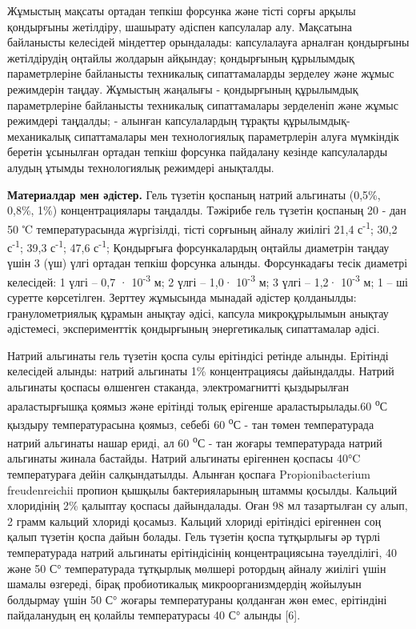\begin{multicols}{2}
Жұмыстың мақсаты ортадан тепкіш форсунка және тісті сорғы арқылы
қондырғыны жетілдіру, шашырату әдіспен капсулалар алу. Мақсатына
байланысты келесідей міндеттер орындалады: капсулалауға арналған
қондырғыны жетілдірудің оңтайлы жолдарын айқындау; қондырғының
құрылымдық параметрлеріне байланысты техникалық сипаттамаларды зерделеу
және жұмыс режимдерін таңдау. Жұмыстың жаңалығы - қондырғының құрылымдық
параметрлеріне байланысты техникалық сипаттамалары зерделеніп және жұмыс
режимдері таңдалды; - алынған капсулалардың тұрақты
құрылымдық-механикалық сипаттамалары мен технологиялық параметрлерін
алуға мүмкіндік беретін ұсынылған ортадан тепкіш форсунка пайдалану
кезінде капсулаларды алудың ұтымды технологиялық режимдері анықталды.

{\bfseries Материалдар мен әдістер.} Гель түзетін қоспаның натрий альгинаты
(0,5\%, 0,8\%, 1\%) концентрациялары таңдалды. Тәжірибе гель түзетін
қоспаның 20 - дан 50 ℃ температурасында жүргізілді, тісті сорғының
айналу жиілігі 21,4 с\textsuperscript{-1}; 30,2 с\textsuperscript{-1};
39,3 с\textsuperscript{-1}; 47,6 с\textsuperscript{-1}; Қондырғыға
форсункалардың оңтайлы диаметрін таңдау үшін 3 (үш) үлгі ортадан тепкіш
форсунка алынды. Форсункадағы тесік диаметрі келесідей: 1 үлгі -- 0,7 ·
10\textsuperscript{-3} м; 2 үлгі -- 1,0· 10\textsuperscript{-3} м; 3
үлгі -- 1,2· 10\textsuperscript{-3} м; 1 -- ші суретте көрсетілген.
Зерттеу жұмысында мынадай әдістер қолданылды: гранулометриялық құрамын
анықтау әдісі, капсула микроқұрылымын анықтау әдістемесі, эксперименттік
қондырғының энергетикалық сипаттамалар әдісі.

Натрий альгинаты гель түзетін қоспа сулы ерітіндісі ретінде алынды.
Ерітінді келесідей алынды: натрий альгинаты 1\% концентрациясы
дайындалды. Натрий альгинаты қоспасы өлшенген стаканда, электромагнитті
қыздырылған араластырғышқа қоямыз және ерітінді толық ерігенше
араластырылады.60 \textsuperscript{о}С қыздыру температурасына қоямыз,
себебі 60 \textsuperscript{о}С - тан төмен температурада натрий
альгинаты нашар ериді, ал 60 \textsuperscript{о}С - тан жоғары
температурада натрий альгинаты жинала бастайды. Натрий альгинаты
ерігеннен қоспасы 40°C температураға дейін салқындатылды. Алынған
қоспаға Propionibacterium freudenreichii пропион қышқылы бактерияларының
штаммы қосылды. Кальций хлоридінің 2\% қалыптау қоспасы дайындалады.
Оған 98 мл тазартылған су алып, 2 грамм кальций хлориді қосамыз. Кальций
хлориді ерітіндісі ерігеннен соң қалып түзетін қоспа дайын болады. Гель
түзетін қоспа тұтқырлығы әр түрлі температурада натрий альгинаты
ерітіндісінің концентрациясына тәуелділігі, 40 және 50 С° температурада
тұтқырлық мөлшері ротордың айналу жиілігі үшін шамалы өзгереді, бірақ
пробиотикалық микроорганизмдердің жойылуын болдырмау үшін 50 С° жоғары
температураны қолданған жөн емес, ерітіндіні пайдаланудың ең қолайлы
температурасы 40 С° алынды {[}6{]}.


\end{multicols}
